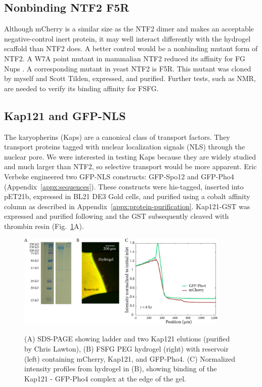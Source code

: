 \subsection{Nonbinding NTF2 F5R}

Although mCherry is a similar size as the NTF2 dimer and makes an acceptable negative-control inert protein, it may well interact differently with the hydrogel scaffold than NTF2 does.  A better control would be a nonbinding mutant form of NTF2.  A W7A point mutant in mammalian NTF2 reduced its affinity for FG Nups \cite{bayliss99,wagner15}.  A corresponding mutant in yeast NTF2 is F5R.  This mutant was cloned by myself and Scott Tilden, expressed, and purified. Further tests, such as NMR, are needed to verify its binding affinity for FSFG.

\subsection{Kap121 and GFP-NLS}
The karyopherins (Kaps) are a canonical class of transport factors.  They transport proteins tagged with nuclear localization signals (NLS) through the nuclear pore.  We were interested in testing Kaps because they are widely studied and much larger than NTF2, so selective transport would be more apparent.  Eric Verbeke engineered two GFP-NLS constructs: GFP-Spo12 and GFP-Pho4 (Appendix~\ref{appx:sequences}).  These constructs were his-tagged, inserted into pET21b, expressed in BL21 DE3 Gold cells, and purified using a cobalt affinity column as described in Appendix~\ref{appx:protein-purification}. 
Kap121-GST was expressed and purified following \cite{tetenbaum-novatt12} and the GST subsequently cleaved with thrombin resin (Fig.~\ref{fig:Kap121}A).
\begin{figure} %
\caption[Kap121 and GFP-NLS cargo.]{(A) SDS-PAGE showing ladder and two Kap121 elutions (purified by Chris Lawton), (B) FSFG PEG hydrogel (right) with reservoir (left) containing mCherry, Kap121, and GFP-Pho4. (C)  Normalized intensity profiles from hydrogel in (B), showing binding of the Kap121 - GFP-Pho4 complex at the edge of the gel.}
\centering
\includegraphics[width=0.9\textwidth]{figs/ch03/Kap121}
\label{fig:Kap121}
\end{figure} %

